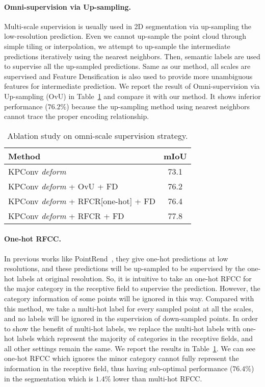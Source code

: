 \documentclass[final]{cvpr}
\begin{document}
\paragraph{Omni-supervision via Up-sampling.}

Multi-scale supervision is usually used in 2D segmentation via up-sampling the low-resolution prediction. Even we cannot up-sample the point cloud through simple tiling or interpolation, we attempt to up-sample the intermediate predictions iteratively using the nearest neighbors. Then, semantic labels are used to supervise all the up-sampled predictions. Same as our method, all scales are supervised and Feature Densification is also used to provide more unambiguous features for intermediate prediction. We report the result of Omni-supervision via Up-sampling (OvU) in Table~\ref{tab:strategy} and compare it with our method. It shows inferior performance ($76.2\%$) because the up-sampling method using nearest neighbors cannot trace the proper encoding relationship.

\begin{table}
\centering
\begin{tabular}{lc} 
\toprule
Method  & mIoU \\
\midrule
KPConv \textit{deform} & 73.1\\
\midrule
KPConv \textit{deform} + OvU + FD & 76.2\\
KPConv \textit{deform} + RFCR[one-hot] + FD & 76.4\\
\midrule
KPConv \textit{deform} + RFCR + FD& 77.8 \\
\bottomrule
\end{tabular}
\caption{Ablation study on omni-scale supervision strategy.}
\label{tab:strategy}
\end{table}

\paragraph{One-hot RFCC.}
In previous works like PointRend~\cite{kirillov2020pointrend}, they give one-hot predictions at low resolutions, and these predictions will be up-sampled to be supervised by the one-hot labels at original resolution. So, it is intuitive to take an one-hot RFCC for the major category in the receptive field to supervise the prediction. However, the category information of some points will be ignored in this way. Compared with this method, we take a multi-hot label for every sampled point at all the scales, and no labels will be ignored in the supervision of down-sampled points. In order to show the benefit of multi-hot labels, we replace the multi-hot labels with one-hot labels which represent the majority of categories in the receptive fields, and all other settings remain the same. We report the results in Table~\ref{tab:strategy}. We can see one-hot RFCC which ignores the minor category cannot fully represent the information in the receptive field, thus having sub-optimal performance ($76.4\%$) in the segmentation which is $1.4\%$ lower than multi-hot RFCC.
\end{document}
